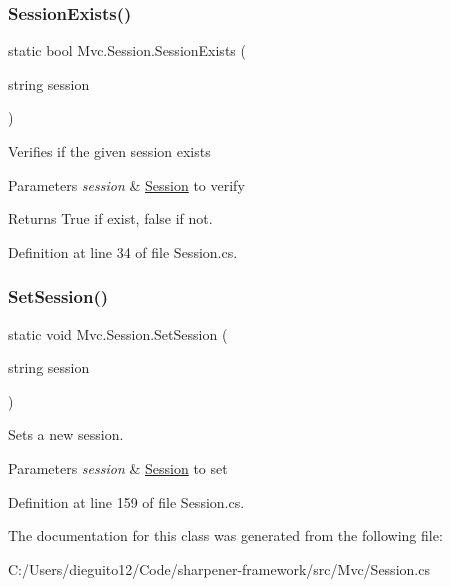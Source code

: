 \subsubsection{\texorpdfstring{Session\+Exists()}{SessionExists()}}
{\footnotesize\ttfamily static bool Mvc.\+Session.\+Session\+Exists (\begin{DoxyParamCaption}\item[{string}]{session }\end{DoxyParamCaption})\hspace{0.3cm}{\ttfamily [static]}}



Verifies if the given session exists 


\begin{DoxyParams}{Parameters}
{\em session} & \hyperlink{class_mvc_1_1_session}{Session} to verify\\
\hline
\end{DoxyParams}
\begin{DoxyReturn}{Returns}
True if exist, false if not.
\end{DoxyReturn}


Definition at line 34 of file Session.\+cs.

\mbox{\label{class_mvc_1_1_session_ac169bdeb3767baa5c632ece305d448f3}} 
\subsubsection{\texorpdfstring{Set\+Session()}{SetSession()}}
{\footnotesize\ttfamily static void Mvc.\+Session.\+Set\+Session (\begin{DoxyParamCaption}\item[{string}]{session }\end{DoxyParamCaption})\hspace{0.3cm}{\ttfamily [static]}}



Sets a new session. 


\begin{DoxyParams}{Parameters}
{\em session} & \hyperlink{class_mvc_1_1_session}{Session} to set\\
\hline
\end{DoxyParams}


Definition at line 159 of file Session.\+cs.



The documentation for this class was generated from the following file\+:\begin{DoxyCompactItemize}
\item 
C\+:/\+Users/dieguito12/\+Code/sharpener-\/framework/src/\+Mvc/Session.\+cs\end{DoxyCompactItemize}
